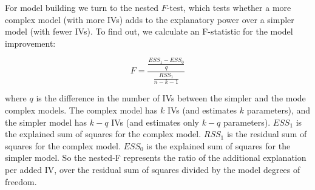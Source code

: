 \documentclass[11pt,openany]{book}\usepackage[]{graphicx}\usepackage[]{color}
\begin{document}
For model building we turn to the nested $F$-test, which tests whether a more complex model (with more IVs) adds to the explanatory power over a simpler model (with fewer IVs). To find out, we calculate an F-statistic for the model improvement: 

\begin{equation}
  F = \frac{\frac{ESS_1-ESS_0}{q}}{\frac{RSS_1}{n-k-1}}
\end{equation}

\noindent where $q$ is the difference in the number of IVs between the simpler and the mode complex models.  The complex model has $k$ IVs (and estimates $k$ parameters), and the simpler model has $k-q$ IVs (and estimates only $k-q$ parameters). $ESS_1$ is the explained sum of squares
for the complex model. $RSS_1$ is the residual sum of squares for the complex model. $ESS_0$ is the explained sum of squares for the simpler
model. So the nested-F represents the ratio of the additional explanation per added IV, over the residual sum of squares divided by the model degrees of freedom.
\end{document}
